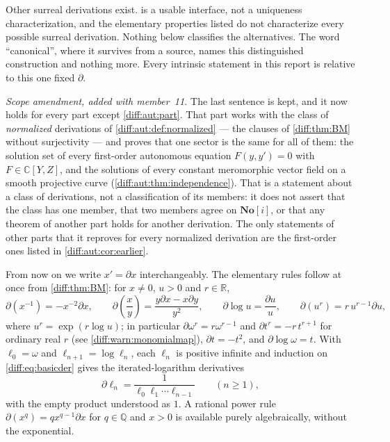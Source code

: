 \documentclass[11pt,letterpaper]{article}
\numberwithin{equation}{section}
\theoremstyle{definition}
\theoremstyle{remark}
\newcommand{\SC}{\mathbf{No}[i]}
\newcommand{\R}{\mathbb R}
\newcommand{\C}{\mathbb C}
\newcommand{\Q}{\mathbb Q}
\newcommand{\der}{\partial}
\begin{document}
\begin{warning}
\label{diff:warn:nouniqueness}
Other surreal derivations exist.  is a usable interface, not
a uniqueness characterization, and the elementary properties listed do not
characterize every possible surreal derivation. Nothing below classifies the
alternatives. The word ``canonical'', where it survives from a source, names
this distinguished construction and nothing more. Every intrinsic statement in
this report is relative to this one fixed $\der$.

\emph{Scope amendment, added with member~11.} The last sentence is kept, and
it now holds for every part except \cref{diff:aut:part}. That part works with
the class of \emph{normalized} derivations of \cref{diff:aut:def:normalized} ---
the clauses of \cref{diff:thm:BM} without surjectivity --- and proves that one
sector is the same for all of them: the solution set of every first-order
autonomous equation $F(y,y')=0$ with $F\in\C[Y,Z]$, and the solutions of every
constant meromorphic vector field on a smooth projective curve
(\cref{diff:aut:thm:independence}). That is a statement about a class of
derivations, not a classification of its members: it does not assert that the
class has one member, that two members agree on $\SC$, or that any theorem of
another part holds for another derivation. The only statements of other parts
that it reproves for every normalized derivation are the first-order ones listed
in \cref{diff:aut:cor:earlier}.
\end{warning}

From now on we write $x'=\der x$ interchangeably. The elementary rules follow
at once from \cref{diff:thm:BM}: for $x\neq0$, $u>0$ and $r\in\R$,
\begin{equation}\label{diff:eq:basicder}
 \der(x^{-1})=-x^{-2}\der x,\qquad
 \der\!\left(\frac{x}{y}\right)=\frac{y\der x-x\der y}{y^{2}},\qquad
 \der\log u=\frac{\der u}{u},\qquad
 \der(u^{r})=r\,u^{r-1}\der u,
\end{equation}
where $u^{r}=\exp(r\log u)$; in particular $\der\omega^{r}=r\omega^{r-1}$ and
$\der t^{r}=-r\,t^{r+1}$ for ordinary real $r$ (see
\cref{diff:warn:monomialmap}), $\der t=-t^{2}$, and $\der\log\omega=t$. With
$\ell_{0}=\omega$ and $\ell_{n+1}=\log\ell_{n}$, each $\ell_{n}$ is positive
infinite and induction on \cref{diff:eq:basicder} gives the iterated-logarithm
derivatives
\begin{equation}\label{diff:eq:logtower}
 \der\ell_{n}=\frac{1}{\ell_{0}\ell_{1}\cdots\ell_{n-1}}\qquad(n\geq1),
\end{equation}
with the empty product understood as $1$. A rational power rule
$\der(x^{q})=qx^{q-1}\der x$ for $q\in\Q$ and $x>0$ is available purely
algebraically, without the exponential.
\end{document}
